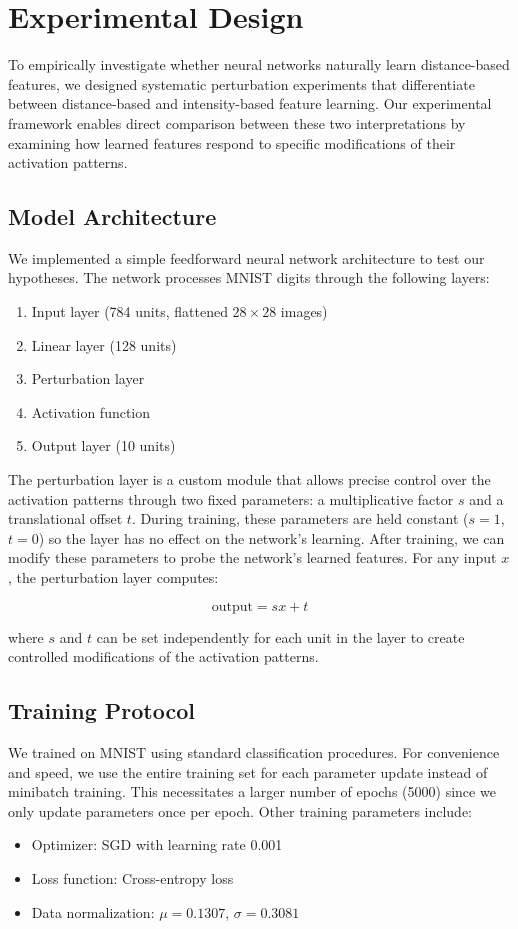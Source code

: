 \section{Experimental Design}

To empirically investigate whether neural networks naturally learn distance-based features, we designed systematic perturbation experiments that differentiate between distance-based and intensity-based feature learning. Our experimental framework enables direct comparison between these two interpretations by examining how learned features respond to specific modifications of their activation patterns.

\subsection{Model Architecture}
We implemented a simple feedforward neural network architecture to test our hypotheses. The network processes MNIST digits through the following layers:
\begin{enumerate}
    \item Input layer (784 units, flattened $28 \times 28$ images)
    \item Linear layer (128 units)
    \item Perturbation layer
    \item Activation function
    \item Output layer (10 units)
\end{enumerate}

The perturbation layer is a custom module that allows precise control over the activation patterns through two fixed parameters: a multiplicative factor $s$ and a translational offset $t$. During training, these parameters are held constant ($s=1$, $t=0$) so the layer has no effect on the network's learning. After training, we can modify these parameters to probe the network's learned features. For any input $x$, the perturbation layer computes:

\begin{equation}
    \text{output} = sx + t
\end{equation}

where $s$ and $t$ can be set independently for each unit in the layer to create controlled modifications of the activation patterns.

\subsection{Training Protocol}
We trained on MNIST using standard classification procedures. For convenience and speed, we use the entire training set for each parameter update instead of minibatch training. This necessitates a larger number of epochs (5000) since we only update parameters once per epoch. Other training parameters include:
\begin{itemize}
    \item Optimizer: SGD with learning rate 0.001
    \item Loss function: Cross-entropy loss
    \item Data normalization: $\mu = 0.1307$, $\sigma = 0.3081$
\end{itemize}

